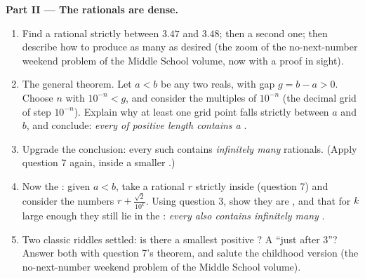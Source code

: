 \begin{problem}
\medskip
\noindent\textbf{Part II --- The rationals are dense.}
\begin{enumerate}[resume]
  \item Find a rational strictly between $3.47$ and $3.48$; then
        a second one; then describe how to produce as many as
        desired (the zoom of the no-next-number weekend problem of the Middle School volume, now with a
        proof in sight).
  \item The general theorem. Let $a < b$ be any two reals, with
        gap $g = b - a > 0$. Choose $n$ with
        $10^{-n} < g$, and consider the multiples of $10^{-n}$
        (the decimal grid of step $10^{-n}$). Explain why at
        least one grid point falls strictly between $a$ and $b$,
        and conclude: \emph{every  of positive length
        contains a }.
  \item Upgrade the conclusion: every such  contains
        \emph{infinitely many} rationals. (Apply question 7
        again, inside a smaller .)
  \item Now the : given $a < b$, take a rational $r$
        strictly inside (question 7) and consider the numbers
        $r + \frac{\sqrt2}{10^k}$. Using question 3, show they
        are , and that for $k$ large enough they still
        lie in the : \emph{every  also contains
        infinitely many }.
  \item Two classic riddles settled: is there a smallest
        positive ? A  ``just after
        $3$''? Answer both with question 7's theorem, and
        salute the childhood version
        (the no-next-number weekend problem of the Middle School volume).
\end{enumerate}


\end{problem}
